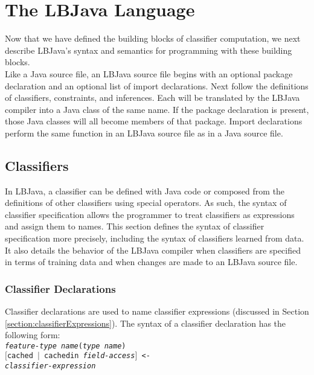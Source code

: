 
\chapter{The LBJava Language} \label{chapter:language}

Now that we have defined the building blocks of classifier computation, we
next describe LBJava's syntax and semantics for programming with these building
blocks. \\

Like a Java source file, an LBJava source file begins with an optional package
declaration and an optional list of import declarations.  Next follow the
definitions of classifiers, constraints, and inferences.  Each will be
translated by the LBJava compiler into a Java class of the same name.  If the
package declaration is present, those Java classes will all become members of
that package.  Import declarations perform the same function in an LBJava source
file as in a Java source file.

\section{Classifiers}

In LBJava, a classifier can be defined with Java code or composed from the
definitions of other classifiers using special operators.  As such, the syntax
of classifier specification allows the programmer to treat classifiers as
expressions and assign them to names.  This section defines the syntax of
classifier specification more precisely, including the syntax of classifiers
learned from data.  It also details the behavior of the LBJava compiler when
classifiers are specified in terms of training data and when changes are made
to an LBJava source file.

\subsection{Classifier Declarations} \label{section:declarations}
Classifier declarations are used to name classifier expressions (discussed in
Section \ref{section:classifierExpressions}).  The syntax of a classifier
declaration has the following form: \\

\vspace{-.25cm}
{\tt \emph{feature-type name}(\emph{type name}) \\
  \mbox{\hspace{1cm}}$[$cached $|$ cachedin \emph{field-access}$]$ <- \\
  \mbox{\hspace{1cm}}\emph{classifier-expression}} \\
\vspace{-.25cm}


